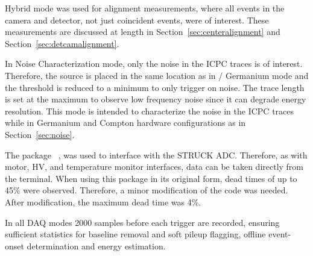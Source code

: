 Hybrid mode was used for alignment measurements, where all events in the camera and detector, not just coincident events, were of interest. These measurements are discussed at length in Section~\ref{sec:centeralignment} and Section~\ref{sec:detcamalignment}.

In Noise Characterization mode, only the noise in the ICPC traces is of interest. Therefore, the \CsS{} source is placed in the same location as in \BaS{}/\ThS{} Germanium mode and the threshold is reduced to a minimum to only trigger on noise. The trace length is set at the maximum to observe low frequency noise since it can degrade energy resolution. This mode is intended to characterize the noise in the ICPC traces while in Germanium and Compton hardware configurations as in Section~\ref*{sec:noise}.

The \julia{} package ~\cite{struckvme}, was used to interface with the STRUCK ADC. Therefore, as with motor, HV, and temperature monitor interfaces, data can be taken directly from the \julia{} terminal. When using this package in its original form, dead times of up to 45\% were observed. Therefore, a minor modification of the code was needed. After modification, the maximum dead time was 4\%.  

In all DAQ modes 2000 samples before each trigger are recorded, ensuring sufficient statistics for baseline removal and soft pileup flagging, offline event-onset determination and energy estimation.   

